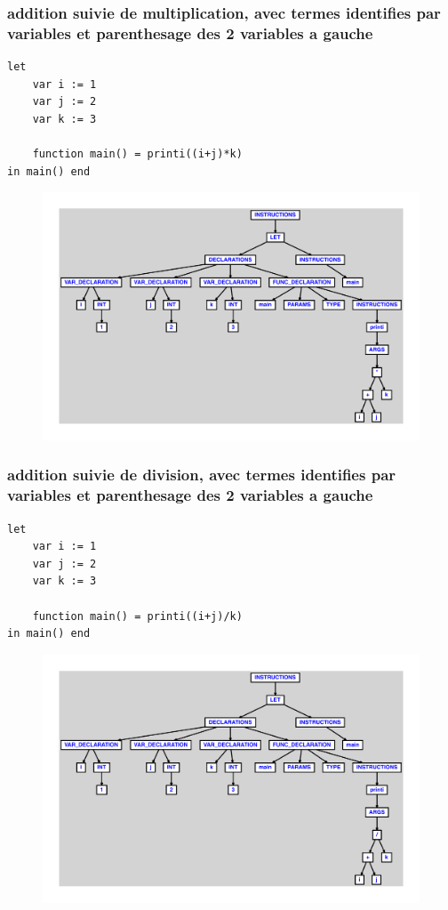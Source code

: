 \documentclass{article}
\begin{document}
\subsubsection{addition suivie de multiplication, avec termes identifies par variables et parenthesage des 2 variables a gauche}
\begin{lstlisting}
let
	var i := 1
	var j := 2
	var k := 3

	function main() = printi((i+j)*k)
in main() end
\end{lstlisting}
\newpage
\begin{figure}[H]
\centering
\includegraphics[max width=\textwidth]{ast/ast_121.pdf}
\end{figure}
\newpage
\subsubsection{addition suivie de division, avec termes identifies par variables et parenthesage des 2 variables a gauche}
\begin{lstlisting}
let
	var i := 1
	var j := 2
	var k := 3

	function main() = printi((i+j)/k)
in main() end
\end{lstlisting}
\newpage
\begin{figure}[H]
\centering
\includegraphics[max width=\textwidth]{ast/ast_122.pdf}
\end{figure}
\newpage
\end{document}
